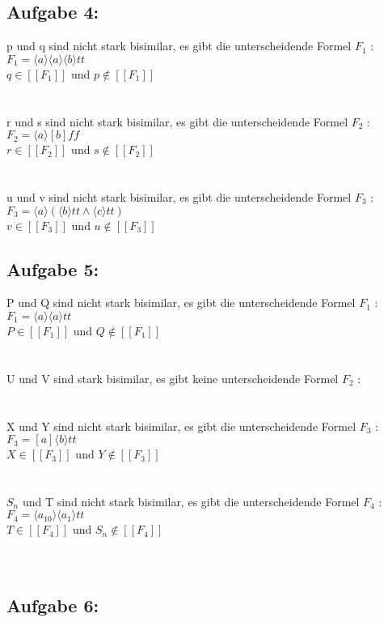 \documentclass[10pt,a4paper,german,landscape,fleqn]{article} \usepackage[utf8]{inputenc} %
\newcommand{\auswf}[1]{[\![ #1 ]\!]}
\begin{document}
\subsection*{Aufgabe 4:}
p und q sind nicht stark bisimilar, es gibt die unterscheidende Formel $F_1$ : \\
$F_1 = \langle a \rangle \langle a \rangle \langle b \rangle tt $ \\
$q \in \auswf{F_1}$ und $p \notin \auswf{F_1}$\\
\\
\\
r und s sind nicht stark bisimilar, es gibt die unterscheidende Formel $F_2$ : \\
$F_2 = \langle a \rangle [b] ff $ \\
$r \in \auswf{F_2}$ und $s \notin \auswf{F_2}$\\
\\
\\
u und v sind nicht stark bisimilar, es gibt die unterscheidende Formel $F_3$ : \\
$F_3 = \langle a \rangle (\langle b \rangle tt \wedge \langle c \rangle tt ) $\\
$v \in \auswf{F_3}$ und $u \notin \auswf{F_3}$\\
\subsection*{Aufgabe 5:}
P und Q sind nicht stark bisimilar, es gibt die unterscheidende Formel $F_1$ : \\
$F_1 = \langle a \rangle \langle a \rangle tt$ \\
$ P\in \auswf{F_1}$ und $Q \notin \auswf{F_1}$\\
\\
\\
U und V sind stark bisimilar, es gibt keine unterscheidende Formel $F_2$ : \\
\\
\\
X und Y sind nicht stark bisimilar, es gibt die unterscheidende Formel $F_3$ : \\
$F_3 =  [a] \langle b \rangle tt$ \\
$X \in \auswf{F_3}$ und $Y \notin \auswf{F_3}$\\
\\
\\
$S_n$ und T sind nicht stark bisimilar, es gibt die unterscheidende Formel $F_4$ : \\
$F_4 = \langle a_{10} \rangle \langle a_1 \rangle tt $ \\
$T \in \auswf{F_4}$ und $S_n \notin \auswf{F_4}$\\
\\
\\
\subsection*{Aufgabe 6:}
\end{document}
